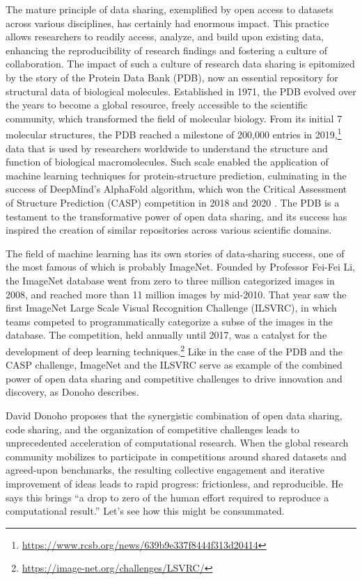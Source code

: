 \documentclass[]{hdsr}
\begin{document}
The mature principle of data sharing, exemplified by open access to datasets across various disciplines, has certainly had enormous impact. This practice allows researchers to readily access, analyze, and build upon existing data, enhancing the reproducibility of research findings and fostering a culture of collaboration.
The impact of such a culture of research data sharing is epitomized by the story of the Protein Data Bank (PDB), now an essential repository for structural data of biological molecules. Established in 1971, the PDB evolved over the years to become a global resource, freely accessible to the scientific community, which transformed the field of molecular biology. From its initial 7 molecular structures, the PDB reached a milestone of 200,000 entries in 2019,\footnote{\url{https://www.rcsb.org/news/639b9e337f8444f313d20414}} data that is used by researchers worldwide to understand the structure and function of biological macromolecules. Such scale enabled the application of machine learning techniques for protein-structure prediction, culminating in the success of DeepMind's AlphaFold algorithm, which won the Critical Assessment of Structure Prediction (CASP) competition in 2018 and 2020 \citep{jumper2021highly}. The PDB is a testament to the transformative power of open data sharing, and its success has inspired the creation of similar repositories across various scientific domains.

The field of machine learning has its own stories of data-sharing success, one of the most famous of which is probably ImageNet. Founded by Professor Fei-Fei Li, the ImageNet database went from zero to three million categorized images in 2008, and reached more than 11 million images by mid-2010. That year saw the first ImageNet Large Scale Visual Recognition Challenge (ILSVRC), in which teams competed to programmatically categorize a subse of the images in the database. The competition, held annually until 2017, was a catalyst for the development of deep learning techniques.\footnote{\url{https://image-net.org/challenges/LSVRC/}} Like in the case of the PDB and the CASP challenge, ImageNet and the ILSVRC serve as example of the combined power of open data sharing and competitive challenges to drive innovation and discovery, as Donoho describes.

David Donoho proposes that the synergistic combination of open data sharing, code sharing, and the organization of competitive challenges leads to unprecedented acceleration of computational research. When the global research community mobilizes to participate in competitions around shared datasets and agreed-upon benchmarks, the resulting collective engagement and iterative improvement of ideas leads to rapid progress: frictionless, and reproducible. He says this brings ``a drop to zero of the human effort required to reproduce a computational result.'' Let's see how this might be consummated.
\end{document}
